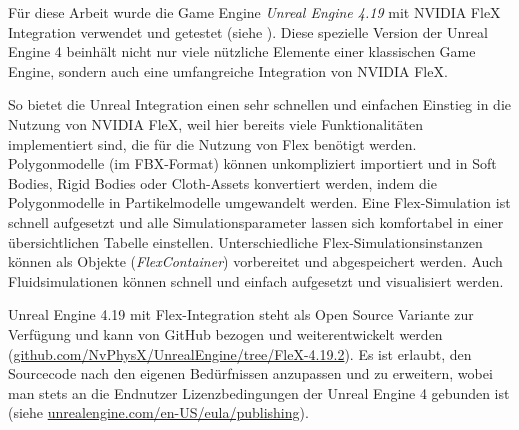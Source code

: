 Für diese Arbeit wurde die Game Engine \textit{Unreal Engine 4.19} mit NVIDIA FleX Integration verwendet und getestet (siehe \cite{UE4FlexDoc}). Diese spezielle Version der Unreal Engine 4 beinhält nicht nur viele nützliche Elemente einer klassischen Game Engine, sondern auch eine umfangreiche Integration von NVIDIA FleX. 

So bietet die Unreal Integration einen sehr schnellen und einfachen Einstieg in die Nutzung von NVIDIA FleX, weil hier bereits viele Funktionalitäten implementiert sind, die für die Nutzung von Flex benötigt werden. Polygonmodelle (im FBX-Format) können unkompliziert importiert und in Soft Bodies, Rigid Bodies oder Cloth-Assets konvertiert werden, indem die Polygonmodelle in Partikelmodelle umgewandelt werden. Eine Flex-Simulation ist schnell aufgesetzt und alle Simulationsparameter lassen sich komfortabel in einer übersichtlichen Tabelle einstellen. Unterschiedliche Flex-Simulationsinstanzen können als Objekte (\textit{FlexContainer}) vorbereitet und abgespeichert werden. Auch Fluidsimulationen können schnell und einfach aufgesetzt und visualisiert werden.

Unreal Engine 4.19 mit Flex-Integration steht als Open Source Variante zur Verfügung und kann von GitHub bezogen und weiterentwickelt werden (\url{github.com/NvPhysX/UnrealEngine/tree/FleX-4.19.2}). Es ist erlaubt, den Sourcecode nach den eigenen Bedürfnissen anzupassen und zu erweitern, wobei man stets an die Endnutzer Lizenzbedingungen der Unreal Engine 4 gebunden ist (siehe \url{unrealengine.com/en-US/eula/publishing}).

